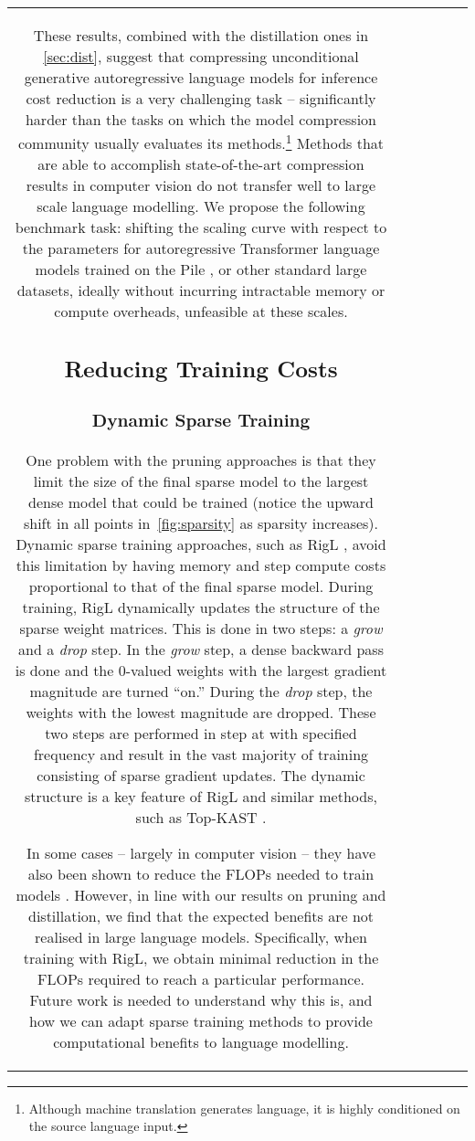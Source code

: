 \documentclass[11pt, a4paper, logo, internal, copyright, nonumbering]{deepmind}
\begin{document}
\begin{center}
\begin{longtable}{cclccc}
{These results, combined with the distillation ones in \autoref{sec:dist}, suggest that compressing unconditional generative autoregressive language models for inference cost reduction is a very challenging task -- significantly harder than the tasks on which the model compression community usually evaluates its methods.\footnote{Although machine translation generates language, it is highly conditioned on the source language input.} Methods that are able to accomplish state-of-the-art compression results in computer vision do not transfer well to large scale language modelling.
We propose the following benchmark task: 
shifting the scaling curve with respect to the parameters for autoregressive Transformer language models trained on the Pile \citep{pile},
or other standard large datasets, ideally without incurring intractable memory or compute overheads, unfeasible at these scales.

\subsection{Reducing Training Costs}
\label{sec:training-cost}

\subsubsection{Dynamic Sparse Training}
One problem with the pruning approaches is that they limit the size of the final sparse model to the largest dense model that could be trained (notice the upward shift in all points in~\autoref{fig:sparsity} as sparsity increases). 
Dynamic sparse training approaches, such as RigL \citep{evci2020rigging}, avoid this limitation by having memory and step compute costs proportional to that of the final sparse model.
During training, RigL \citep{evci2020rigging} dynamically updates the structure of the sparse weight matrices. 
This is done in two steps: a \textit{grow} and a \textit{drop} step. 
In the \textit{grow} step, a dense backward pass is done and the 0-valued weights with the largest gradient magnitude are turned ``on.'' During the \textit{drop} step, the weights with the lowest magnitude are dropped. 
These two steps are performed in step at with specified frequency and result in the vast majority of training consisting of sparse gradient updates.
The dynamic structure is a key feature of RigL and similar methods, such as Top-KAST \citep{jayakumar2021top}.


In some cases -- largely in computer vision -- they have also been shown to reduce the FLOPs needed to train models \citep{evci2020rigging, jayakumar2021top}.
However, in line with our results on pruning and distillation, we find that the expected benefits are not realised in large language models. 
Specifically, when training with RigL, we obtain minimal reduction in the FLOPs required to reach a particular performance.
Future work is needed to understand why this is, and how we can adapt sparse training methods to provide computational benefits to language modelling.


}
\end{longtable}
\end{center}
\end{document}
